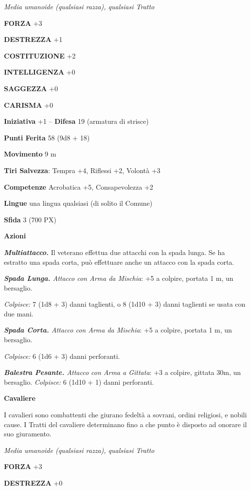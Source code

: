 \begin{multicols}{2}
	\textit{Media umanoide (qualsiasi razza), qualsiasi Tratto}

	\textbf{FORZA} +3

	\textbf{DESTREZZA} +1

	\textbf{COSTITUZIONE} +2

	\textbf{INTELLIGENZA} +0

	\textbf{SAGGEZZA} +0

	\textbf{CARISMA} +0

	\textbf{Iniziativa} +1 -- \textbf{Difesa} 19 (armatura di strisce)

	\textbf{Punti Ferita} 58 (9d8 + 18)

	\textbf{Movimento} 9 m

	\textbf{Tiri Salvezza}: Tempra +4, Riflessi +2, Volontà +3

	\textbf{Competenze} Acrobatica +5, Consapevolezza +2

	\textbf{Lingue} una lingua qualsiasi (di solito il Comune)

	\textbf{Sfida} 3 (700 PX)

	\textbf{Azioni}

	\textit{\textbf{Multiattacco.}} Il veterano effettua due attacchi con la spada lunga. Se ha estratto una spada corta, può effettuare anche un attacco con la spada corta.

	\textit{\textbf{Spada Lunga.} Attacco con Arma da Mischia}: +5 a colpire, portata 1 m, un bersaglio.

	\textit{Colpisce:} 7 (1d8 + 3) danni taglienti, o 8 (1d10 + 3) danni taglienti se usata con due mani.

	\textit{\textbf{Spada Corta.} Attacco con Arma da Mischia}: +5 a colpire, portata 1 m, un bersaglio.

	\textit{Colpisce:} 6 (1d6 + 3) danni perforanti.

	\textit{\textbf{Balestra Pesante.} Attacco con Arma a Gittata}: +3 a colpire, gittata 30m, un bersaglio. \textit{Colpisce:} 6 (1d10 + 1) danni perforanti.

	\medskip\textbf{Cavaliere}

	I cavalieri sono combattenti che giurano fedeltà a sovrani, ordini religiosi, e nobili cause. I Tratti del cavaliere determinano fino a che punto è disposto ad onorare il suo giuramento.

	\textit{Media umanoide (qualsiasi razza), qualsiasi Tratto}

	\textbf{FORZA} +3

	\textbf{DESTREZZA} +0


\end{multicols}
